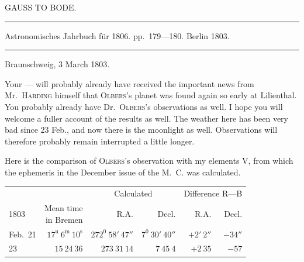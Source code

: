 \bigskip{}
\begin{center}
GAUSS TO BODE.\par
\medskip\hrule\medskip
Astronomisches Jahrbuch für 1806. pp.\ 179—180. Berlin 1803.\par
\medskip\hrule
\end{center}\medskip
\begin{flushright}Braunschweig, 3 March 1803.\end{flushright}

Your — will probably already have received the important news from Mr.\ \textsc{Harding} himself that \textsc{Olbers}’s planet was found again so early at Lilienthal. You probably already have Dr.\ \textsc{Olbers}’s observations as well. I hope you will welcome a fuller account of the results as well. The weather here has been very bad since 23 Feb., and now there is the moonlight as well. Observations will therefore probably remain interrupted a little longer.

Here is the comparison of \textsc{Olbers}’s observation with my elements V, from which the ephemeris in the December issue of the M.\ C. was calculated.
\begin{center}
\begingroup\small\setlength{\tabcolsep}{3pt}
\begin{tabular}{l|r|r|r|r|r}
& &\multicolumn{2}{c|}{Calculated}&\multicolumn{2}{c}{Difference R—B}\\
1803&\shortstack{Mean time\\in Bremen}&R.A.&Decl.&R.A.&Decl.\\\hline
Feb.\ 21&$17^{\mathrm u}\ 6^{\mathrm m}\ 10^{\mathrm s}$&$272^0\ 58'\ 47''$&$7^0\ 30'\ 40''$&$+2'\ 2''$&$-34''$\\
23&$15\ 24\ 36$&$273\ 31\ 14$&$7\ 45\ 4$&$+2\ 35$&$-57$
\end{tabular}\endgroup
\end{center}


